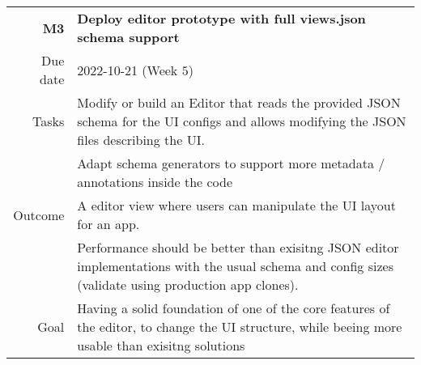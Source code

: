 \begin{table}[htbp]
    \small
    \colorbox{usethiscolorhere}{
    \centering
    \begin{tabularx}{\textwidth}{@{} r Y @{}}
        \textbf{M3}
        & \textbf{Deploy editor prototype with full views.json schema support}\vspace{2mm}\\
        Due date & 2022-10-21 (Week $5$)\vspace{2mm}\\
         Tasks & Modify or build an Editor that reads the provided JSON schema for the UI configs and allows modifying the JSON files describing the UI.\\
         & Adapt schema generators to support more metadata / annotations inside the code\vspace{2mm}\\
        Outcome & A editor view where users can manipulate the UI layout for an app.\\
        & Performance should be better than exisitng JSON editor implementations with the usual schema and config sizes (validate using production app clones).\vspace{2mm}\\
        Goal & Having a solid foundation of one of the core features of the editor, to change the UI structure, while beeing more usable than exisitng solutions\vspace{2mm}\\
    \end{tabularx}
    }
\end{table}


